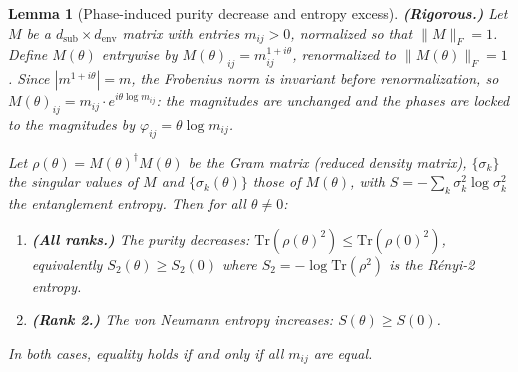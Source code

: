 \documentclass[12pt,a4paper]{article}
\newtheorem{lemma}{Lemma}
\theoremstyle{definition}
\theoremstyle{remark}
\begin{document}
\begin{lemma}[Phase-induced purity decrease and entropy excess]
\textbf{(Rigorous.)}
\label{lem:entropy_excess}
Let $M$ be a $d_{\mathrm{sub}} \times d_{\mathrm{env}}$ matrix with
entries $m_{ij} > 0$, normalized so that $\|M\|_F = 1$. Define
$M(\theta)$ entrywise by $M(\theta)_{ij} = m_{ij}^{1 + i\theta}$,
renormalized to $\|M(\theta)\|_F = 1$. Since $|m^{1+i\theta}| = m$,
the Frobenius norm is invariant before renormalization, so
$M(\theta)_{ij} = m_{ij} \cdot e^{i\theta \log m_{ij}}$: the
magnitudes are unchanged and the phases are locked to the magnitudes by
$\varphi_{ij} = \theta \log m_{ij}$.

Let $\rho(\theta) = M(\theta)^\dagger M(\theta)$ be the Gram matrix
(reduced density matrix), $\{\sigma_k\}$ the singular values of $M$
and $\{\sigma_k(\theta)\}$ those of $M(\theta)$, with $S = -\sum_k
\sigma_k^2 \log \sigma_k^2$ the entanglement entropy. Then for all
$\theta \neq 0$:
\begin{enumerate}
\item[(a)] \textbf{(All ranks.)} The purity decreases:
$\mathrm{Tr}(\rho(\theta)^2) \leq \mathrm{Tr}(\rho(0)^2)$,
equivalently $S_2(\theta) \geq S_2(0)$ where $S_2 = -\log
\mathrm{Tr}(\rho^2)$ is the R\'enyi-2 entropy.
\item[(b)] \textbf{(Rank 2.)} The von Neumann entropy increases:
$S(\theta) \geq S(0)$.
\end{enumerate}
In both cases, equality holds if and only if all $m_{ij}$ are equal.
\end{lemma}
\end{document}

